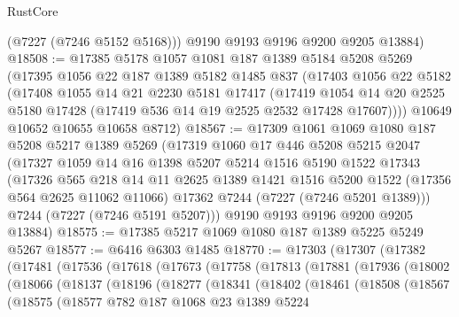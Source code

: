 \begin{lexlean}{RustCore}
\begin{coremodule}
        (@7227 (@7246 @5152 @5168)))
      @9190
      @9193
      @9196
      @9200
      @9205
      @13884)
@18508 := @17385
    @5178
    @1057
    @1081
    @187
    @1389
    @5184
    @5208
    @5269
    (@17395
      @1056
      @22
      @187
      @1389
      @5182
      @1485
      @837
      (@17403
        @1056
        @22
        @5182
        (@17408
          @1055
          @14
          @21
          @2230
          @5181
          @17417
          (@17419
            @1054
            @14
            @20
            @2525
            @5180
            @17428
            (@17419 @536 @14 @19 @2525 @2532 @17428 @17607))))
      @10649
      @10652
      @10655
      @10658
      @8712)
@18567 := @17309
    @1061
    @1069
    @1080
    @187
    @5208
    @5217
    @1389
    @5269
    (@17319
      @1060
      @17
      @446
      @5208
      @5215
      @2047
      (@17327
        @1059
        @14
        @16
        @1398
        @5207
        @5214
        @1516
        @5190
        @1522
        @17343
        (@17326
          @565
          @218
          @14
          @11
          @2625
          @1389
          @1421
          @1516
          @5200
          @1522
          (@17356 @564 @2625 @11062 @11066)
          @17362
          @7244
          (@7227 (@7246 @5201 @1389)))
        @7244
        (@7227 (@7246 @5191 @5207)))
      @9190
      @9193
      @9196
      @9200
      @9205
      @13884)
@18575 := @17385 @5217 @1069 @1080 @187 @1389 @5225 @5249 @5267
@18577 := @6416 @6303 @1485
@18770 := @17303
    (@17307
      (@17382
        (@17481
          (@17536
            (@17618
              (@17673
                (@17758
                  (@17813
                    (@17881
                      (@17936
                        (@18002
                          (@18066
                            (@18137
                              (@18196
                                (@18277
                                  (@18341
                                    (@18402
                                      (@18461
                                        (@18508
                                          (@18567
                                            (@18575
                                              (@18577
                                                @782
                                                @187
                                                @1068
                                                @23
                                                @1389
                                                @5224

\end{coremodule}
\end{lexlean}
